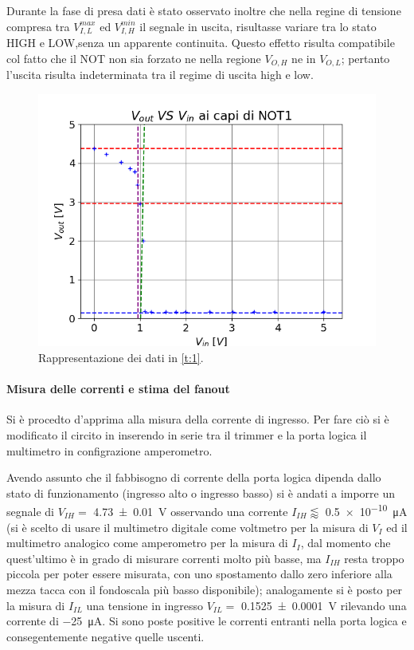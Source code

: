 Durante la fase di presa dati è stato osservato inoltre che nella regine di tensione compresa tra 	$V_{I,L}^{max}$ ed $V_{I,H}^{min}$ il segnale in uscita, risultasse variare tra lo stato HIGH e LOW,senza un apparente continuita.
Questo effetto risulta compatibile col fatto che il NOT non sia forzato ne nella regione $V_{O,H}$ ne in $V_{O,L}$; pertanto  l'uscita risulta indeterminata tra il regime di uscita high e low.
\begin{center}
	\begin{figure}[h]
		\includegraphics[scale=0.50]{../Figs-Tabs/in-ot2.png}
		\caption{Rappresentazione dei dati in \tablename{ \ref{t:1}}.}
		\label{f:i1}
	\end{figure}
\end{center}


\paragraph{Misura delle correnti e stima del fanout}
	Si è procedto d'apprima alla misura della corrente di ingresso.
	Per fare ciò si è modificato il circito in  inserendo in serie tra il trimmer e la porta logica il multimetro in configrazione amperometro.

	Avendo assunto che il fabbisogno di corrente della porta logica dipenda 	dallo stato di funzionamento (ingresso alto o ingresso basso)
	si è andati a imporre un segnale di $V_{IH} =$ \SI{4.73\pm 0.01}{\volt} osservando una corrente $I_{IH} \lessapprox$ \SI{0.5e-10}{\micro \ampere} (si è scelto di usare il multimetro digitale come voltmetro per la misura di $V_I$ ed il multimetro analogico come amperometro per la misura di $I_I$, dal momento che quest'ultimo è in grado di misurare correnti molto più basse, ma $I_{IH}$ resta troppo piccola per poter essere misurata, con uno spostamento dallo zero inferiore alla mezza tacca con il fondoscala più basso disponibile);
	analogamente si è posto per la misura di  $I_{IL}$ una tensione in ingresso $V_{IL} =$ \SI{0.1525(1)}{\volt} rilevando una corrente di \SI{-25}{\micro \ampere}. Si sono poste positive le correnti entranti nella porta logica e consegentemente negative quelle uscenti.

